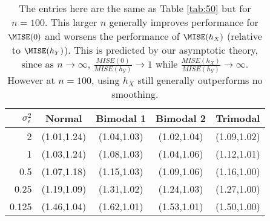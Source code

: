 \begin{table}[ht]
\centering
\begin{tabular}{r|cccc}
  \hline
$\sigma_{\epsilon}^2$ & Normal & Bimodal 1 & Bimodal 2 & Trimodal \\ 
  \hline
2 & (1.01,1.24) & (1.04,1.03) & (1.02,1.04) & (1.09,1.02) \\ 
  1 & (1.03,1.24) & (1.08,1.03) & (1.04,1.06) & (1.12,1.01) \\ 
  0.5 & (1.07,1.18) & (1.15,1.03) & (1.09,1.06) & (1.16,1.00) \\ 
  0.25 & (1.19,1.09) & (1.31,1.02) & (1.24,1.03) & (1.27,1.00) \\ 
  0.125 & (1.46,1.04) & (1.62,1.01) & (1.53,1.01) & (1.50,1.00) \\ 
   \hline
\end{tabular}
\caption{The entries here are the same as Table \ref{tab:50} but for $n=100$. This larger $n$ generally improves performance for $\MISE(0)$ and worsens the performance of $\MISE(h_X)$ (relative to $\MISE(h_Y)$). This is predicted by our asymptotic theory, since as $n \rightarrow \infty$, $\frac{MISE(0)}{MISE(h_Y)} \rightarrow 1$ while $\frac{MISE(h_X)}{MISE(h_Y)} \rightarrow \infty$. However at $n=100$, using $h_X$ still generally outperforms no smoothing.} 
\label{tab:100}
\end{table}

